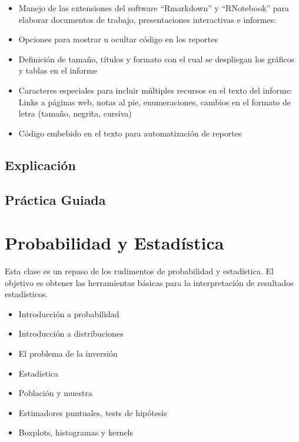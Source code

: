 \documentclass[]{book}
\providecommand{\tightlist}{%
  \setlength{\itemsep}{0pt}\setlength{\parskip}{0pt}}
\begin{document}
\begin{itemize}
\tightlist
\item
  Manejo de las extensiones del software ``Rmarkdown'' y ``RNotebook'' para elaborar documentos de trabajo, presentaciones interactivas e informes:
\item
  Opciones para mostrar u ocultar código en los reportes
\item
  Definición de tamaño, títulos y formato con el cual se despliegan los gráficos y tablas en el informe
\item
  Caracteres especiales para incluir múltiples recursos en el texto del informe: Links a páginas web, notas al pie, enumeraciones, cambios en el formato de letra (tamaño, negrita, cursiva)
\item
  Código embebido en el texto para automatización de reportes
\end{itemize}

\hypertarget{explicacion-3}{%
\section{Explicación}\label{explicacion-3}}

\hypertarget{practica-guiada-3}{%
\section{Práctica Guiada}\label{practica-guiada-3}}

\hypertarget{probabilidad-y-estadistica}{%
\chapter{Probabilidad y Estadística}\label{probabilidad-y-estadistica}}

Esta clase es un repaso de los rudimentos de probabilidad y estadística. El objetivo es obtener las herramientas básicas para la interpretación de resultados estadísticos.

\begin{itemize}
\tightlist
\item
  Introducción a probabilidad
\item
  Introducción a distribuciones
\item
  El problema de la inversión
\item
  Estadística
\item
  Población y muestra
\item
  Estimadores puntuales, tests de hipótesis
\item
  Boxplots, histogramas y kernels
\end{itemize}
\end{document}
